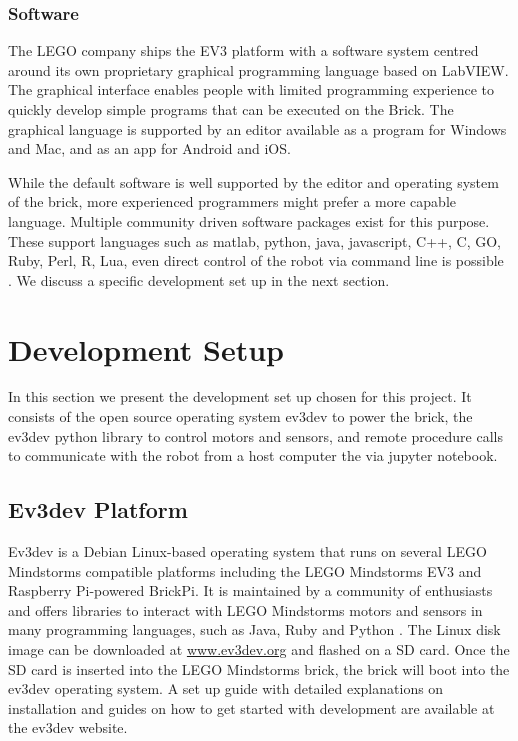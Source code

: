 \documentclass[11pt, a4paper]{article}
\begin{document}
\subsubsection{Software}
The LEGO company ships the EV3 platform with a software system centred around its own proprietary graphical programming language based on LabVIEW. The graphical interface enables people with limited programming experience to quickly develop simple programs that can be executed on the Brick. The graphical language is supported by an editor available as a program for Windows and Mac, and as an app for Android and iOS.

While the default software is well supported by the editor and operating system of the brick, more experienced programmers might prefer a more capable language. Multiple community driven software packages exist for this purpose. These support languages such as matlab, python, java, javascript, C++, C, GO, Ruby, Perl, R, Lua, even direct control of the robot via command line is possible \cite{ev3dev}. We discuss a specific development set up in the next section.



\section{Development Setup}
In this section we present the development set up chosen for this project. It consists of the open source operating system ev3dev to power the brick, the ev3dev python library to control motors and sensors, and remote procedure calls to communicate with the robot from a host computer the via jupyter notebook.

\subsection{Ev3dev Platform}
Ev3dev is a Debian Linux-based operating system that runs on several LEGO Mindstorms compatible platforms including the LEGO Mindstorms EV3 and Raspberry Pi-powered BrickPi. It is maintained by a community of enthusiasts and offers libraries to interact with LEGO Mindstorms motors and sensors in many programming languages, such as Java, Ruby and Python \cite{ev3dev}. The Linux disk image can be downloaded at \href{https://www.ev3dev.org/}{www.ev3dev.org} and flashed on a SD card. Once the SD card is inserted into the LEGO Mindstorms brick, the brick will boot into the ev3dev operating system. A set up guide with detailed explanations on installation and guides on how to get started with development are available at the ev3dev website.
\end{document}
